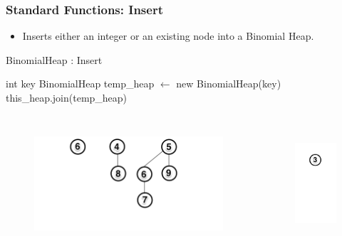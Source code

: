 \documentclass[13pt]{beamer}
\begin{document}
\begin{frame}
\frametitle{Standard Functions: Insert}
  \begin{itemize}
    \item Inserts either an integer or an existing node into a Binomial Heap.
  \end{itemize}

   \begin{algorithm}[H]
        \small
        \caption{BinomialHeap : Insert}
        \begin{algorithmic}
          \REQUIRE int key
          \STATE BinomialHeap temp\_heap $\leftarrow$ new BinomialHeap(key)
          \STATE this\_heap.join(temp\_heap)
        \end{algorithmic}
        \end{algorithm}

  \begin{columns}[T] %
    \begin{column}[T]{8cm} %
       \begin{figure}
        \includegraphics[height=4.35cm]{./img/preinsert.png}
      \end{figure}
    \end{column}
    \begin{column}[T]{2cm} %
      \begin{figure}
        \includegraphics[height=4.35cm]{./img/toinsert.png}
      \end{figure}
    \end{column}
  \end{columns}
\end{frame}
\end{document}
